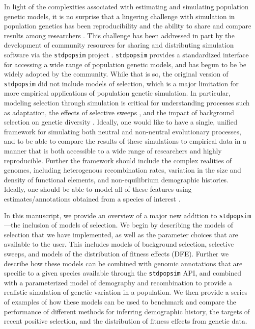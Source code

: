 \documentclass[hidelinks]{article}
\newcommand{\stdpopsim}{\texttt{stdpopsim}\xspace}
\begin{document}
    In light of the complexities associated with estimating and simulating
    population genetic models, it is no surprise that
    a lingering challenge with simulation in population genetics has been
    reproducibility and the ability to share and compare results among 
    researchers \citep[e.g.,][]{ragsdale2020lessons}.
    This challenge has been addressed in part by the development
    of community resources for sharing and distributing simulation software
    via the \stdpopsim project \citep{adrion2020community}. \stdpopsim
    provides a standardized interface for accessing a wide range of
    population genetic models, and has begun to be be widely adopted by the community. %
    While that is so, the original version of \stdpopsim did not include
    models of selection, which is a major limitation for more empirical
    applications of population genetic simulation. In particular, modeling selection
    through simulation is critical for understanding processes such
    as adaptation, the effects of selective sweeps \citep[e.g.][]{braverman1995hitchhiking,fay2000hitchhiking,przeworski2002signature,przeworski2005signature,schrider2015soft}, and the impact of
    background selection on genetic diversity
    \citep[e.g.][]{charlesworth1993effect,charlesworth1995pattern,williamson2002genealogy,ewing2016consequences,torres2020temporal}.
    Ideally, one would like
    to have a single, unified framework for simulating both neutral and
    non-neutral evolutionary processes, and to be able to compare the
    results of these simulations to empirical data in a manner that is
    both accessible to a wide range of researchers and highly reproducible. 
    Further the framework should include the complex realities of 
    genomes, including heterogenous recombination rates, 
    variation in the size and density of functional elements, and
    non-equilibrium demographic histories. Ideally, one should be able
    to model all of these features using estimates/annotations obtained
    from a species of interest \citep[e.g.][]{schrider2020background,rodrigues2024shared}.

    In this manuscript, we provide an overview of a major new addition
    to \stdpopsim---the inclusion of models of selection.
    We begin by describing the models of selection that we have implemented,
    as well as the parameter choices that are available to the user.
    This includes models of background selection, selective sweeps, and
    models of the distribution of fitness effects (DFE).
    Further we describe how these models can be combined with genomic
    annotations that are specific to a given species available
    through the \stdpopsim API, and combined with a parameterized model of
    demography and recombination to provide a realistic simulation of
    genetic variation in a population.
    We then provide a series of examples of how these models can be used
    to benchmark and compare the performance of different methods for
    inferring demographic history, the targets of recent positive selection,
    and the distribution of fitness effects from genetic data. 
\end{document}
